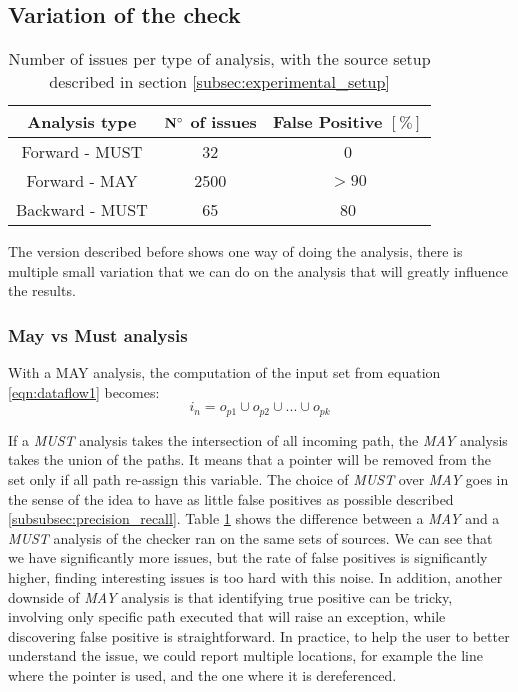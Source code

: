 \subsection{Variation of the check}
\label{subsec:rule_variation}

\begin{table}[h]
	\centering
	\caption{Number of issues per type of analysis, with the source setup described in section \ref{subsec:experimental_setup}}
	\label{table:issue_per_analysis_type}
	\begin{tabular}{|c|c|c|}
		\hline
		\bf Analysis type &  \bf $\bf N^{\circ}$  of issues &  \bf False Positive $[\%]$ \\ \hline
		Forward - MUST &  32 &  0 \\ 
		Forward - MAY &  2500 & $> 90$  \\ 
		Backward - MUST &  65 & 80 \\ \hline
	\end{tabular}
\end{table}

The version described before shows one way of doing the analysis, there is multiple small variation that we can do on the analysis that will greatly influence the results.

\subsubsection{May vs Must analysis}
\label{subsubsec:may_vs_must}

With a MAY analysis, the computation of the input set from equation \ref{eqn:dataflow1} becomes:
\begin{equation}\label{eqn:mayvsmust}
i_{n} = o_{p1}  \cup   o_{p2}  \cup  ... \cup   o_{pk}
\end{equation}

If a \emph{MUST} analysis takes the intersection of all incoming path, the \emph{MAY} analysis takes the union of the paths. 
It means that a pointer will be removed from the set only if all path re-assign this variable.
The choice of \emph{MUST} over \emph{MAY} goes in the sense of the idea to have as little false positives as possible described \ref{subsubsec:precision_recall}.
Table \ref{table:issue_per_analysis_type} shows the difference between a \emph{MAY} and a \emph{MUST} analysis of the checker ran on the same sets of sources.
We can see that we have significantly more issues, but the rate of false positives is significantly higher, finding interesting issues is too hard with this noise. 
In addition, another downside of \emph{MAY} analysis is that identifying true positive can be tricky, involving only specific path executed that will raise an exception, while discovering false positive is straightforward.
In practice, to help the user to better understand the issue, we could report multiple locations, for example the line where the pointer is used, and the one where it is dereferenced.

